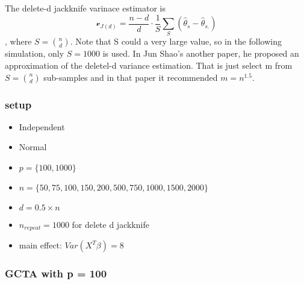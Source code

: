 \documentclass[]{article}
\providecommand{\tightlist}{%
  \setlength{\itemsep}{0pt}\setlength{\parskip}{0pt}}
\begin{document}
The delete-d jackknife varinace estimator is \[
\mathcal{v}_{J(d)} = \frac{n-d}{d} \cdot \frac{1}{S}\sum_{S}(\hat{\theta}_s - \hat{\theta}_{s.} )
\], where \(S =\binom{n}{d}\). Note that S could a very large value, so
in the following simulation, only \(S = 1000\) is used. In Jun Shao's
another paper, he proposed an approximation of the deletel-d variance
estimation. That is just select m from \(S =\binom{n}{d}\) sub-samples
and in that paper it recommended \(m = n^{1.5}\).

\subsubsection{setup}\label{setup-1}

\begin{itemize}
\tightlist
\item
  Independent
\item
  Normal
\item
  \(p = \{100, 1000\}\)
\item
  \(n = \{50, 75,100, 150, 200, 500, 750,1000, 1500, 2000\}\)
\item
  \(d = 0.5 \times n\)
\item
  \(n_{repeat} = 1000\) for delete d jackknife
\item
  main effect: \(Var(X^T\beta) = 8\)
\end{itemize}

\newpage

\subsubsection{GCTA with p = 100}\label{gcta-with-p-100}

\begingroup\fontsize{7}{9}\selectfont
\end{document}
